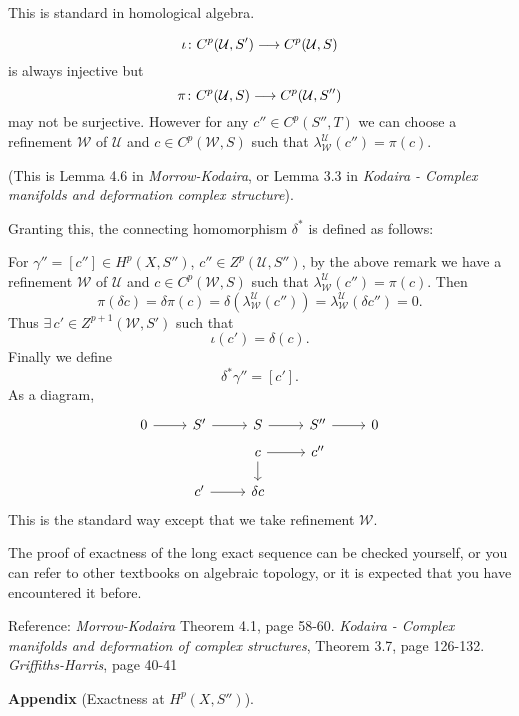 \documentclass[12pt]{article}
\begin{document}
This is standard in homological algebra.

\begin{remark}
\[
  \iota\colon C^p(\mathcal{U},S')\longrightarrow C^p(\mathcal{U},S)  
\] is always injective but \[
  \pi\colon C^p(\mathcal{U},S)\longrightarrow C^p(\mathcal{U},S'')
\] may not be surjective. However for any \(c''\in C^p(S'',T)\) we can choose a
refinement \(\mathcal{W}\) of \(\mathcal{U}\) and \(c\in C^p(\mathcal{W},S)\) such
that \(\lambda_{\mathcal{W}}^{\mathcal{U}}(c'')=\pi(c)\).

(This is Lemma 4.6 in \emph{Morrow-Kodaira}, or Lemma 3.3 in \emph{Kodaira - Complex
manifolds and deformation complex structure}).
\end{remark}

Granting this, the connecting homomorphism \(\delta^*\) is defined as follows:

For \(\gamma''=[c'']\in H^p(X,S'')\), \(c''\in Z^p(\mathcal{U},S'')\), by the above
remark we have a refinement \(\mathcal{W}\) of \(\mathcal{U}\) and \(c\in C^p(
\mathcal{W},S)\) such that \(\lambda_{\mathcal{W}}^{\mathcal{U}}(c'')=\pi(c)\). Then \[
  \pi(\delta c)=\delta\pi(c)=\delta(\lambda_{\mathcal{W}}^{\mathcal{U}}(c''))
  =\lambda_{\mathcal{W}}^{\mathcal{U}}(\delta c'')=0
.\] Thus \(\exists\,c'\in Z^{p+1}(\mathcal{W},S')\) such that \[
  \iota(c')=\delta(c)
.\] Finally we define \[
  \delta^* \gamma''=[c']
.\] As a diagram,
\[\begin{tikzcd}[row sep=tiny]
	0 & {S'} & S & {S''} & 0 \\
	&& c & {c''} \\
	\\ \\ 
	& {c'} & {\delta c}
	\arrow[from=1-1, to=1-2]
	\arrow[from=1-2, to=1-3]
	\arrow[from=1-3, to=1-4]
	\arrow[from=1-4, to=1-5]
	\arrow[from=2-3, to=2-4]
	\arrow[from=5-2, to=5-3]
	\arrow[from=2-3, to=5-3]
\end{tikzcd}\]
This is the standard way except that we take refinement \(\mathcal{W}\).

The proof of exactness of the long exact sequence can be checked yourself, or you 
can refer to other textbooks on algebraic topology, or it is expected that you have
encountered it before.

Reference: \emph{Morrow-Kodaira} Theorem 4.1, page 58-60. \emph{Kodaira - Complex
manifolds and deformation of complex structures}, Theorem 3.7, page 126-132.
\emph{Griffiths-Harris}, page 40-41

\noindent\textbf{Appendix} (Exactness at \(H^p(X,S'')\)).
\end{document}
